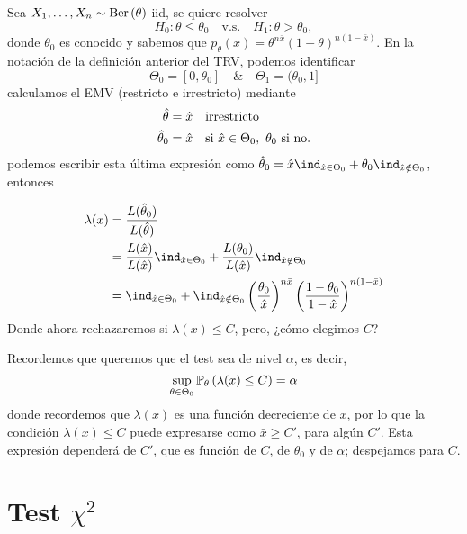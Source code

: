 \begin{example}
	Sea $X_1,\ldots,X_n\sim\text{Ber}\left(\theta\right)$ iid, se quiere resolver
	\begin{equation}
		H_0:\theta \leq\theta_0\quad \text{v.s.}\quad H_1:\theta >\theta_0,
	\end{equation}
donde $\theta_0$ es conocido y sabemos que $p_\theta(x) = \theta^{n\bar{x}}(1-\theta)^{n(1-\bar{x})}$. En la notación de la definición anterior del TRV, podemos identificar
\begin{equation}
	\Theta_0 = [0,\theta_0] \quad \& \quad \Theta_1 = (\theta_0, 1]
\end{equation}
calculamos el EMV (restricto e irrestricto) mediante 
\begin{align}
	\thetahat &= \hat{x}\quad \text{irrestricto}\\
	\thetahat_0 &= \hat{x} \quad \text{si } \hat{x}\in\Theta_0,\ \theta_0 \text{ si no.}
\end{align}
podemos escribir esta última expresión como $\thetahat_0 = \hat{x} \ind_{\hat{x}\in\Theta_0} + \theta_0\ind_{\hat{x}\notin\Theta_0}$, entonces

\begin{align}
	\lambda(x) &= \frac{L(\thetahat_0)}{L(\thetahat)}\\ 
				&= \frac{L(\hat{x})}{L(\hat{x})} \ind_{\hat{x}\in\Theta_0} + \frac{L(\theta_0)}{L(\hat{x})} \ind_{\hat{x}\notin\Theta_0} \\
				&= \ind_{\hat{x}\in\Theta_0} + \ind_{\hat{x}\notin\Theta_0} \left(\frac{\theta_0}{\hat{x}}\right)^{n\bar{x}}\left(\frac{1-\theta_0}{1-\hat{x}}\right)^{n(1-\bar{x})}
\end{align}
Donde ahora rechazaremos si $\lambda(x)\leq C$, pero, ¿cómo elegimos $C$?

Recordemos que queremos que el test sea de nivel $\alpha$, es decir, 
\begin{equation}
 	\sup_{\theta\in\Theta_0} \mathbb{P}_\theta \left(\lambda(x)\leq C\right) = \alpha
 \end{equation} 
 donde recordemos que $\lambda(x)$ es una función decreciente de $\bar{x}$, por lo que la condición $\lambda(x)\leq C$ puede expresarse como $\bar{x}\geq C'$, para algún $C'$. Esta expresión dependerá de $C'$, que es función de $C$, de $\theta_0$ y de $\alpha$; despejamos para $C$.

 \end{example} 

 \section{Test $\chi^2$} 
\label{sub:test_chi2}

